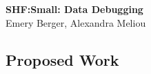 \documentclass[10pt]{article}
\begin{document}
\thispagestyle{empty}
\singlespace

\newcommand{\projectname}{
\begin{center}
        {\large\bf\textsf{
            SHF:Small: Data Debugging}}\\
        {\textsf{Emery Berger, Alexandra Meliou}} 
\end{center}}


\clearpage

\thispagestyle{empty}
\singlespace

\clearpage



\projectname
{\singlespace
\setcounter{page}{1}






\subsection*{Proposed Work}






%
%
%
%
%
%


 


}

\clearpage
{\singlespace \small


}

%
%
\end{document}
